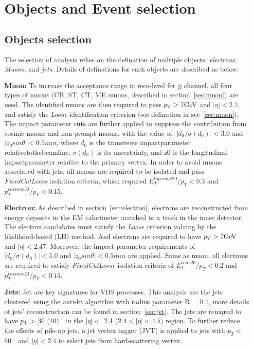 \section{Objects and Event selection}
\label{sec:selection}

\subsection{Objects selection}

The selection of analysis relies on the defination of multiple objects: \textit{electrons}, \textit{Muons}, and \textit{jets}.
Details of definations for each objects are described as below:

\textbf{Muon:} 
To increase the acceptance range in reco-level for \llll jj channel, all four types of muons 
(CB, ST, CT, ME muons, described in section~\ref{sec:muon}) are used.
The identified muons are then required to pass $p_{T} > 7 \text{Ge\kern -0.1em V}$ and $|\eta| < 2.7$,
and satisfy the \textit{Loose} identification criterion (see defination in sec~\ref{sec:muon}).
The impact parameter cuts are further applied to suppress the contribution from cosmic muons and non-prompt muons,
with the value of: $|d_{0}/\sigma(d_{0})| < 3.0$ and $|z_{0} sin\theta| < 0.5 mm$,
where $d_{0}$ is the transverse impactparameter relativetothebeamline, $\sigma(d_{0})$ is its uncertainty, 
and z0 is the longitudinal impactparameter relative to the primary vertex.
In order to avoid muons associated with jets, all muons are required to be isolated and pass \textit{FixedCutLoose} isolation criteria,
which required $E_{T}^{topocone20} / p_{T} < 0.3$ and $p_{T}^{varcone30} / p_{T} < 0.15$.

\textbf{Electron:} 
As described in section~\ref{sec:electron}, electrons are reconstructed from energy deposits in the EM calorimeter matched to a track in the inner detector.
The electron candidates must satisfy the \textit{Loose} criterion valuing by the likelihood-based (LH) method.
And electrons are required to have $p_{T} > 7 \text{Ge\kern -0.1em V}$ and $|\eta| < 2.47$.
Moreover, the impact parameter requirements of $|d_{0}/\sigma(d_{0})| < 5.0$ and $|z_{0} sin\theta| < 0.5 mm$ are applied.
Same as muon, all electrons are required to satisfy \textit{FixedCutLoose} isolation criteria
of $E_{T}^{cone20} / p_{T} < 0.2$ and $p_{T}^{varcone20} / p_{T} < 0.15$.

\textbf{Jets:} 
Jet are key signatures for VBS processes. 
This analysis use the jets clustered using the anti-kt algorithm with radius parameter R = 0.4, more details of jets' reconstruction can be found in section~\ref{sec:jet}.
The jets are reuiqred to have $p_{\text{T}} >$ 30 (40)~\gev~in the $|\eta| <$ 2.4 ($2.4 < |\eta| < 4.5)$ region.
To further reduce the effects of pile-up jets, a jet vertex tagger (JVT) is applied to jets with $p_{T} <$ 60~\gev~and $|\eta| < 2.4$ to select jets from hard-scattering vertex.

